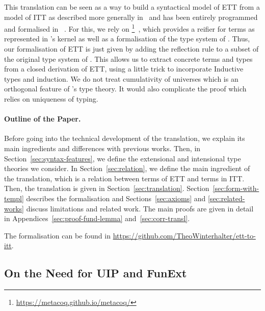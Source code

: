 This translation can be seen as a way to build a syntactical model of
ETT from a model of ITT as described more generally
in~\cite{boulier17:next-syntac-model-type-theor} and has been entirely
programmed and
formalised in
\Coq~\cite{coq}. For this, we rely on
\TemplateCoq\footnote{\url{https://metacoq.github.io/metacoq/}}~\cite{DBLP:conf/itp/AnandBCST18},
which provides a reifier for \Coq terms as represented in \Coq's kernel
as well as a formalisation of the type system of \Coq.
%
Thus, our formalisation of ETT is just given by adding the reflection
rule to a subset of the original type system of \Coq.
%
This allows us to extract concrete \Coq terms and types from a closed
derivation of ETT, using a little trick to incorporate Inductive types
and induction. We do not treat cumulativity of universes which is an
orthogonal feature of \Coq's type theory. It would also complicate the
proof which relies on uniqueness of typing.

\paragraph*{Outline of the Paper.}

Before going into the technical development of the translation, we
explain its main ingredients and differences with previous works.
Then, in Section~\ref{sec:syntax-features}, we define the extensional
and intensional type theories we consider. In
Section~\ref{sec:relation}, we define the main ingredient of the
translation, which is a relation between terms of ETT and terms in ITT.
%
Then, the translation is given in Section~\ref{sec:translation}.
Section~\ref{sec:form-with-templ} describes the \Coq formalisation and
Sections~\ref{sec:axioms} and \ref{sec:related-works} discuss
limitations and related work.
%
The main proofs are given in detail in Appendices~\ref{sec:proof-fund-lemma}
and~\ref{sec:corr-transl}.


The \Coq formalisation can be found in
\url{https://github.com/TheoWinterhalter/ett-to-itt}.


\subsection{On the Need for UIP and FunExt}

